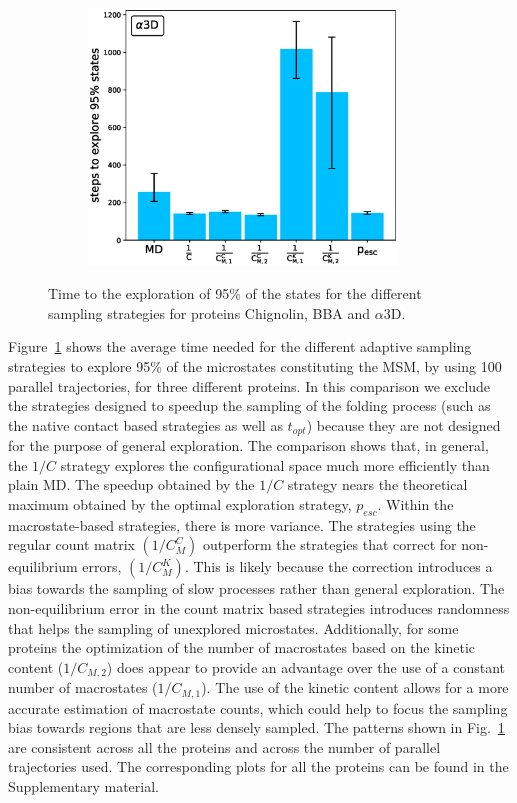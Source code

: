\begin{figure}[H]
\begin{subfigure}[t]{0.5\textwidth}
    \includegraphics[width=0.9\textwidth]{figures/A3D_7_steps10000_nparallel100_explore.eps}   
  \end{subfigure}
  \caption{Time to the exploration of 95\% of the states for the different sampling strategies for proteins Chignolin, BBA and $\alpha$3D.}
  \label{fig:Time_explore}
\end{figure}

Figure~\ref{fig:Time_explore} shows the average time needed for the different
adaptive sampling strategies to explore 95\% of the microstates constituting the
MSM, by using 100 parallel trajectories, for three different proteins.
In this comparison we exclude the strategies designed to speedup the sampling
of the folding process (such as the native contact based strategies as well as
$t_{opt}$) because they are not designed for the purpose of general exploration.
The comparison shows that, in general, the $1/C$ strategy explores the
configurational space much more efficiently than plain MD. The speedup obtained
by the $1/C$ strategy nears the theoretical maximum obtained by the optimal
exploration strategy, $p_{esc}$. Within the macrostate-based strategies, there
is more variance. The strategies using the regular count matrix $(1/C_M^C)$ outperform
the strategies that correct for non-equilibrium errors, $(1/C_M^K)$. This is
likely because the correction introduces a bias towards the sampling of slow
processes rather than general exploration. The non-equilibrium error in the
count matrix based strategies introduces randomness that helps the sampling of
unexplored microstates. Additionally, for some proteins the optimization of the number of
macrostates based on the kinetic content ($1/C_{M, 2}$) does appear to provide
an advantage over the use of a constant number of macrostates ($1/C_{M, 1}$). 
The use of the kinetic content allows for a more accurate estimation of
macrostate counts, which could help to focus the sampling bias towards regions
that are less densely sampled. 
The patterns shown in Fig.~\ref{fig:Time_explore}
are consistent across all the proteins and across the number of
parallel trajectories used. The corresponding plots for all the proteins can be
found in the Supplementary material.

